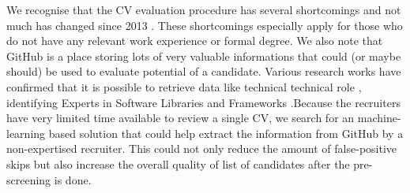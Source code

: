 We recognise that the CV evaluation procedure has several shortcomings and not much has changed since 2013 \cite{Capiluppi}. These shortcomings especially apply for those who do not have any relevant work experience or formal degree. We also note that GitHub is a place storing lots of very valuable informations that could (or maybe should) be used to evaluate potential of a candidate. Various research works have confirmed that it is possible to retrieve data like technical technical role \cite{TechnicalRole}, identifying Experts in Software Libraries and Frameworks \cite{SoftwareLibraries} .Because the recruiters have very limited time available to review a single CV, we search for an machine-learning based solution that could help extract the information from GitHub by a non-expertised recruiter. This could not only reduce the amount of false-positive skips but also increase the overall quality of list of candidates after the pre-screening is done.

